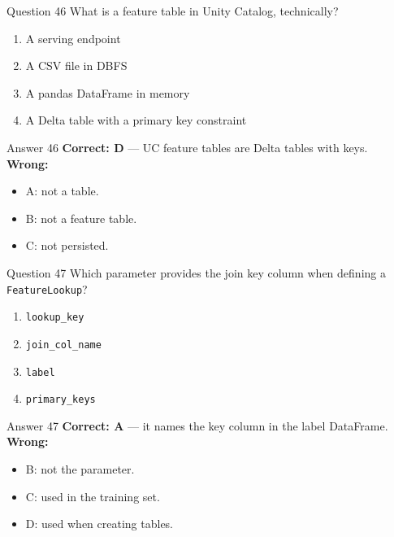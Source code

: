 \documentclass[aspectratio=169,11pt]{beamer}
\begin{document}
\begin{frame}{Question 46}
What is a feature table in Unity Catalog, technically?
\begin{enumerate}[label=\Alph*.]
\item A serving endpoint
\item A CSV file in DBFS
\item A pandas DataFrame in memory
\item A Delta table with a primary key constraint
\end{enumerate}
\end{frame}
\begin{frame}{Answer 46}
\textbf{Correct: D} --- UC feature tables are Delta tables with keys.\\
\vspace{0.5em}
\textbf{Wrong:}
\begin{itemize}
\item A: not a table.
\item B: not a feature table.
\item C: not persisted.
\end{itemize}
\end{frame}

\begin{frame}{Question 47}
Which parameter provides the join key column when defining a \texttt{FeatureLookup}?
\begin{enumerate}[label=\Alph*.]
\item \texttt{lookup\_key}
\item \texttt{join\_col\_name}
\item \texttt{label}
\item \texttt{primary\_keys}
\end{enumerate}
\end{frame}
\begin{frame}{Answer 47}
\textbf{Correct: A} --- it names the key column in the label DataFrame.\\
\vspace{0.5em}
\textbf{Wrong:}
\begin{itemize}
\item B: not the parameter.
\item C: used in the training set.
\item D: used when creating tables.
\end{itemize}
\end{frame}
\end{document}
